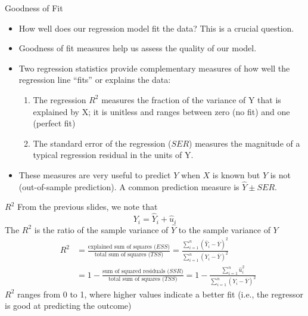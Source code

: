 \documentclass[notes,10pt, aspectratio=169]{beamer}
\begin{document}
\begin{frame}{Goodness of Fit}
\begin{itemize}
\item How well does our regression model fit the data? This is a crucial question.
\item Goodness of fit measures help us assess the quality of our model.
\item Two regression statistics provide complementary measures of how well the regression line “fits” or explains the data:
\begin{enumerate}
    \item The regression $R^2$ measures the fraction of the variance of Y that is explained by X; it is unitless and ranges between zero (no fit) and one (perfect fit)
    \item The standard error of the regression ($SER$) measures the magnitude of a typical regression residual in the units of Y.
\end{enumerate}
\item These measures are very useful to predict $Y$ when $X$ is known but $Y$ is not (out-of-sample prediction). A common prediction measure is $\hat{Y}\pm SER$.
\end{itemize}
\end{frame}


\begin{frame}{$R^2$}
From the previous slides, we note that
\begin{equation*}
    Y_i = \hat{Y}_i + \hat{u}_i
\end{equation*}
The $R^2$ is the ratio of the sample variance of $\hat{Y}$ to the sample variance of $Y$
\begin{eqnarray*}
    &R^2 &= \frac{\text{explained sum of squares ($ESS$)}}{\text{total sum of squares ($TSS$)}} = \frac{\sum_{i=1}^n (\hat{Y}_i - \overline{Y})^2}{\sum_{i=1}^n (Y_i - \overline{Y})^2}\\
    & &= 1-\frac{\text{sum of squared residuals ($SSR$)}}{\text{total sum of squares ($TSS$)}} = 1-\frac{\sum_{i=1}^n \hat{u}_i^2}{\sum_{i=1}^n (Y_i - \overline{Y})^2}
\end{eqnarray*}
$R^2$ ranges from 0 to 1, where higher values indicate a better fit (i.e., the regressor is good at predicting the outcome)
\end{frame}
\end{document}
